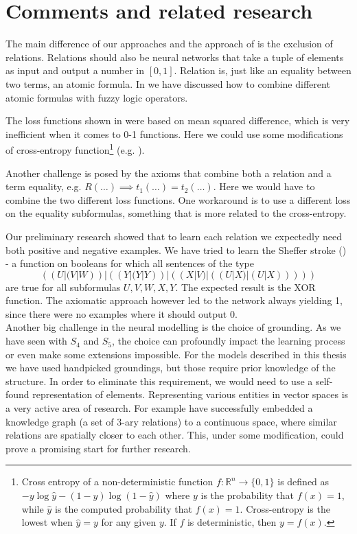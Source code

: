 \chapter{Comments and related research}
\label{comments}
The main difference of our approaches and the approach of \cite{serafini} is the exclusion of relations. Relations should also be neural networks that take a tuple of elements as input and output a number in $[0,1]$. Relation is, just like an equality between two terms, an atomic formula. In  we have discussed how to combine different atomic formulas with fuzzy logic operators.

The loss functions shown in  were based on mean squared difference, which is very inefficient when it comes to 0-1 functions. Here we could use some modifications of cross-entropy function\footnote{Cross entropy of a non-deterministic function $f:\mathbb{R}^n\rightarrow \{0,1\}$ is defined as $-y\log\widehat{y}-(1-y)\log(1-\widehat{y})$ where $y$ is the probability that $f(x)=1$, while $\widehat{y}$ is the computed probability that $f(x)=1$. Cross-entropy is the lowest when $\widehat{y}=y$ for any given $y$. If $f$ is deterministic, then $y=f(x)$.} (e.g. \cite{crossentropy}).

Another challenge is posed by the axioms that combine both a relation and a term equality, e.g. $R(\dots)\implies t_1(\dots)=t_2(\dots)$. Here we would have to combine the two different loss functions. One workaround is to use a different loss on the equality subformulas, something that is more related to the cross-entropy.

Our preliminary research showed that to learn each relation we expectedly need both positive and negative examples. We have tried to learn the Sheffer stroke (\cite{sheffer}) - a function on booleans for which all sentences of the type $$((U|(V|W))|((Y|(Y|Y))|((X|V)|((U|X)|(U|X)))))$$ are true for all subformulas $U,V,W,X,Y$. The expected result is the XOR function. The axiomatic approach however led to the network always yielding 1, since there were no examples where it should output 0.\\

Another big challenge in the neural modelling is the choice of grounding. As we have seen with $S_4$ and $S_5$, the choice can profoundly impact the learning process or even make some extensions impossible. For the models described in this thesis we have used handpicked groundings, but those require prior knowledge of the structure. In order to eliminate this requirement, we would need to use a self-found representation of elements. Representing various entities in vector spaces is a very active area of research. For example \cite{grounding_wang} have successfully embedded a knowledge graph (a set of 3-ary relations) to a continuous space, where similar relations are spatially closer to each other. This, under some modification, could prove a promising start for further research.\\

